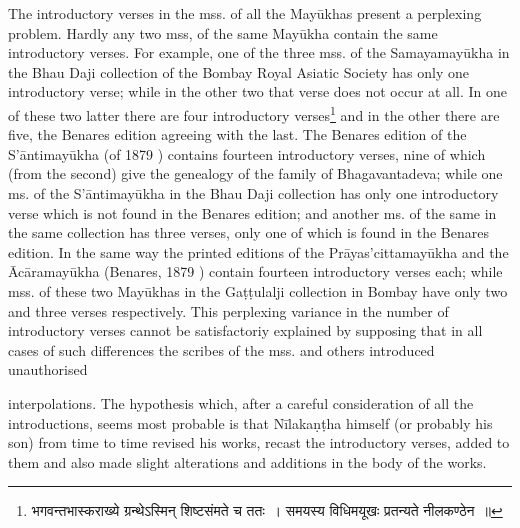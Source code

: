 \documentclass[11pt, openany]{book}
\begin{document}
The introductory verses in the mss. of all the Mayūkhas present a perplexing problem. Hardly any two mss, of the same Mayūkha contain the same introductory verses. For example, one of the three mss. of the Samayamayūkha in the Bhau Daji collection of the Bombay Royal Asiatic Society has only one introductory verse; while in the other two that verse does not occur at all. In one of these two latter there are four introductory verses\renewcommand{\thefootnote}{2}\footnote{भगवन्तभास्कराख्ये ग्रन्थेऽस्मिन् शिष्टसंमते च ततः~। समयस्य विधिमयूखः प्रतन्यते नीलकण्ठेन~॥} and in the other there are five, the Benares edition agreeing with the last. The Benares edition of the S'āntimayūkha (of 1879 ) contains fourteen introductory verses, nine of which (from the second) give the genealogy of the family of Bhagavantadeva; while one ms. of the S'āntimayūkha in the Bhau Daji collection has only one introductory verse which is not found in the Benares edition; and another ms. of the same in the same collection has three verses, only one of which is found in the Benares edition. In the same way the printed editions of the Prāyas'cittamayūkha and the Ācāramayūkha (Benares, 1879 ) contain fourteen introductory verses each; while mss. of these two Mayūkhas in the Gaṭṭulalji collection in Bombay have only two and three verses respectively. This perplexing variance in the number of introductory verses cannot be satisfactoriy explained by supposing that in all cases of such differences the scribes of the mss. and others introduced unauthorised

\newpage

\noindent
interpolations. The hypothesis which, after a careful consideration of all the introductions, seems most probable is that Nīlakaṇṭha himself (or probably his son) from time to time revised his works, recast the introductory verses, added to them and also made slight alterations and additions in the body of the works.
\end{document}
